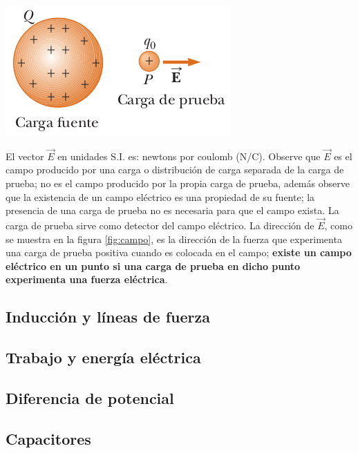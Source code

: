 \documentclass{article}
\begin{document}
\begin{center}
	\includegraphics[scale=0.50]{figuras/campo-1.png}
\label{fig:campo}
\end{center}

El vector $\vec{E}$ en unidades S.I. es: newtons por coulomb (N/C). Observe que $\vec{E}$ es el campo producido por una carga o distribución de carga separada de la carga de prueba; no es el campo producido por la propia carga de prueba, además observe que la existencia de un campo eléctrico es una propiedad de su fuente; la presencia de una carga de prueba no es necesaria para que el campo exista. La carga de prueba sirve como detector del campo eléctrico. La dirección de $\vec{E}$, como se muestra en la figura \ref{fig:campo}, es la dirección de la fuerza que experimenta una carga de prueba positiva cuando es colocada en el campo; \textbf{existe un campo eléctrico en un punto si una carga de prueba en dicho punto experimenta una fuerza eléctrica}.

\pagebreak


	\subsection{Inducción y líneas de fuerza}
	\subsection{Trabajo y energía eléctrica}
	\subsection{Diferencia de potencial}
	\subsection{Capacitores}
\end{document}
